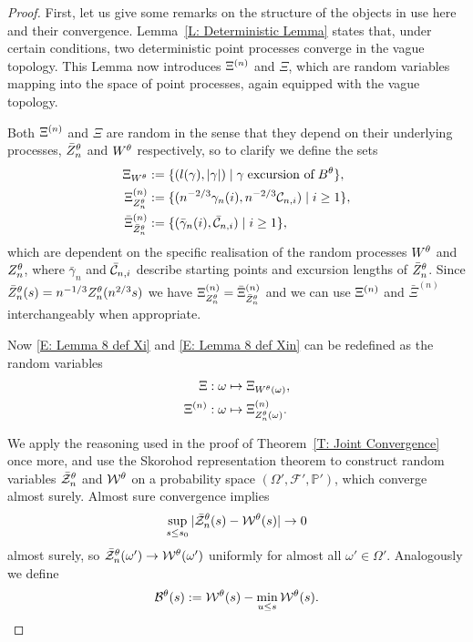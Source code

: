 \begin{proof}
	First, let us give some remarks on the structure of the objects in use here and their convergence.
	Lemma~\ref{L: Deterministic Lemma} states that, under certain conditions, two deterministic point processes converge in the vague topology.
	This Lemma now introduces $\Xi^{(n)}$ and $\Xi$, which are random variables mapping into the space of point processes, again equipped with the vague topology.
	
	Both $\Xi^{(n)}$ and $\Xi$ are random in the sense that they depend on their underlying processes, $\bar{Z}^{\theta}_n$ and $W^{\theta}$ respectively,
	so to clarify we define the sets
	\begin{equation} \label{E: Lemma 8 def XiWt}
	\begin{aligned}
	\Xi_{W^{\theta}} &:= \{ (l(\gamma), |\gamma|) \; | \; \gamma \; \text{excursion of} \; B^{\theta}\}, \\
	\Xi^{(n)}_{Z_n^{\theta}} &:= \{ ( n^{-2 / 3} \gamma_n(i), n^{-2 / 3} \mathcal{C}_{n,i} ) \; | \; i \geq 1 \}, \\
	\bar{\Xi}^{(n)}_{\bar{Z}^{\theta}_n} &:= \{ ( \bar{\gamma}_n(i), \bar{\mathcal{C}}_{n,i} ) \; | \; i \geq 1 \},
	\end{aligned}
	\end{equation}
	which are dependent on the specific realisation of the random processes $W^{\theta}$ and $Z_n^{\theta}$,
	where $\bar{\gamma}_n$ and $\bar{\mathcal{C}}_{n,i}$ describe starting points and excursion lengths of $\bar{Z}^{\theta}_n$.
	Since $\bar{Z}^{\theta}_n(s) = n^{-1 / 3}Z_n^{\theta}(n^{2 / 3}s)$ we have $\Xi^{(n)}_{Z_n^{\theta}} = \bar{\Xi}^{(n)}_{\bar{Z}^{\theta}_n}$
	and we can use $\Xi^{(n)}$ and $\bar{\Xi}^{(n)}$ interchangeably when appropriate.
	
	Now \eqref{E: Lemma 8 def Xi} and \eqref{E: Lemma 8 def Xin} can be redefined as the random variables
	\begin{equation} \label{E: Lemma 8 def Xi Xin}
	\begin{aligned}
	\Xi : \; &\omega \mapsto \Xi_{W^{\theta}(\omega)}, \\
	\Xi^{(n)} : \; &\omega \mapsto \Xi^{(n)}_{Z_n^{\theta}(\omega)}.
	\end{aligned}
	\end{equation}
	
	We apply the reasoning used in the proof of Theorem~\ref{T: Joint Convergence} once more,
	and use the Skorohod representation theorem to construct random variables
	$\bar{\mathcal{Z}}^{\theta}_n$ and $\mathcal{W}^{\theta}$ on a probability space $(\Omega', \mathcal{F}', \mathbb{P}')$,
	which converge almost surely.
	Almost sure convergence implies
	\begin{equation}
	\sup_{s \leq s_0}|\bar{\mathcal{Z}}^{\theta}_n(s) - \mathcal{W}^{\theta}(s)| \rightarrow 0
	\end{equation}
	almost surely,
	so $\bar{\mathcal{Z}}^{\theta}_n(\omega') \rightarrow \mathcal{W}^{\theta}(\omega')$ uniformly for almost all $\omega' \in \Omega'$. 
	Analogously we define
	\begin{equation}
		\mathcal{B}^{\theta}(s) := \mathcal{W}^{\theta}(s) - \min_{u \leq s}\mathcal{W}^{\theta}(s).
	\end{equation}
	

\end{proof}
